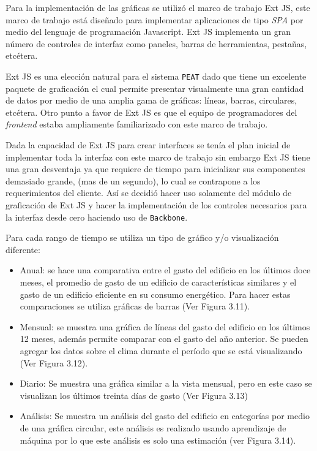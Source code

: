Para la implementación de las gráficas se utilizó el marco de trabajo
Ext JS, este marco de trabajo está diseñado para implementar aplicaciones
de tipo \textit{SPA} por medio del lenguaje de programación Javascript.
Ext JS implementa un gran número de controles de interfaz como paneles,
barras de herramientas, pestañas, etcétera.

Ext JS es una elección natural para el sistema \texttt{PEAT} dado que tiene un
excelente paquete de graficación el cual permite presentar visualmente una gran
cantidad de datos por medio de una amplia gama de gráficas: líneas, barras,
circulares, etcétera. Otro punto a favor de Ext JS es que el equipo de programadores
del \textit{frontend} estaba ampliamente familiarizado con este marco de trabajo.

Dada la capacidad de Ext JS para crear interfaces se tenía el plan inicial
de implementar toda la interfaz con este marco de trabajo sin embargo Ext JS tiene
una gran desventaja ya que requiere de tiempo para inicializar sus componentes
demasiado grande, (mas de un segundo), lo cual se contrapone a los requerimientos
del cliente.
Así se decidió hacer uso solamente del módulo de graficación de Ext JS y
hacer la implementación de los controles necesarios para la interfaz desde cero
haciendo uso de \texttt{Backbone}.

Para cada rango de tiempo se utiliza un tipo de gráfico y/o visualización diferente:

\begin{itemize}
\item Anual: se hace una comparativa entre el gasto del edificio en los últimos doce
  meses, el promedio de gasto de un edificio de características similares y
  el gasto de un edificio eficiente en su consumo energético. Para hacer estas
  comparaciones se utiliza gráficas de barras (Ver Figura 3.11).
\item Mensual: se muestra una gráfica de líneas del gasto del edificio
  en los últimos 12 meses, además permite comparar con el gasto del año anterior.
  Se pueden agregar los datos sobre el clima durante el período que se está
  visualizando (Ver Figura 3.12).
\item Diario: Se muestra una gráfica similar a la vista mensual, pero en este caso
  se visualizan los últimos treinta días de gasto (Ver Figura 3.13)
\item Análisis: Se muestra un análisis del gasto del edificio en categorías
  por medio de una gráfica circular, este análisis es realizado usando
  aprendizaje de máquina por lo que este análisis es solo una estimación
  (ver Figura 3.14).
\end{itemize}

